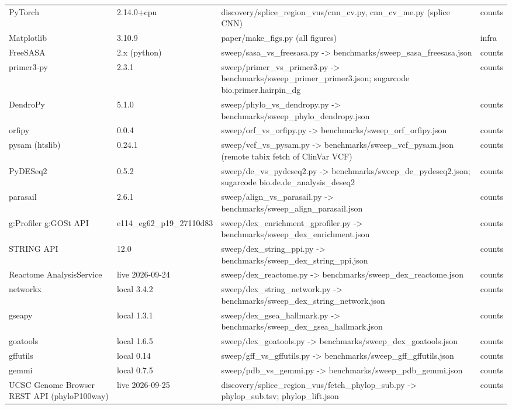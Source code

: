 \begin{center}
\begin{tabular}{lp{1.8cm}p{7.5cm}l}
PyTorch & 2.14.0+cpu & discovery/splice\_region\_vus/cnn\_cv.py, cnn\_cv\_me.py (splice CNN) & counts\\
Matplotlib & 3.10.9 & paper/make\_figs.py (all figures) & infra\\
FreeSASA & 2.x (python) & sweep/sasa\_vs\_freesasa.py -> benchmarks/sweep\_sasa\_freesasa.json & counts\\
primer3-py & 2.3.1 & sweep/primer\_vs\_primer3.py -> benchmarks/sweep\_primer\_primer3.json; sugarcode bio.primer.hairpin\_dg & counts\\
DendroPy & 5.1.0 & sweep/phylo\_vs\_dendropy.py -> benchmarks/sweep\_phylo\_dendropy.json & counts\\
orfipy & 0.0.4 & sweep/orf\_vs\_orfipy.py -> benchmarks/sweep\_orf\_orfipy.json & counts\\
pysam (htslib) & 0.24.1 & sweep/vcf\_vs\_pysam.py -> benchmarks/sweep\_vcf\_pysam.json (remote tabix fetch of ClinVar VCF) & counts\\
PyDESeq2 & 0.5.2 & sweep/de\_vs\_pydeseq2.py -> benchmarks/sweep\_de\_pydeseq2.json; sugarcode bio.de.de\_analysis\_deseq2 & counts\\
parasail & 2.6.1 & sweep/align\_vs\_parasail.py -> benchmarks/sweep\_align\_parasail.json & counts\\
g:Profiler g:GOSt API & e114\_eg62\_p19\_27110d83 & sweep/dex\_enrichment\_gprofiler.py -> benchmarks/sweep\_dex\_enrichment.json & counts\\
STRING API & 12.0 & sweep/dex\_string\_ppi.py -> benchmarks/sweep\_dex\_string\_ppi.json & counts\\
Reactome AnalysisService & live 2026-09-24 & sweep/dex\_reactome.py -> benchmarks/sweep\_dex\_reactome.json & counts\\
networkx & local 3.4.2 & sweep/dex\_string\_network.py -> benchmarks/sweep\_dex\_string\_network.json & counts\\
gseapy & local 1.3.1 & sweep/dex\_gsea\_hallmark.py -> benchmarks/sweep\_dex\_gsea\_hallmark.json & counts\\
goatools & local 1.6.5 & sweep/dex\_goatools.py -> benchmarks/sweep\_dex\_goatools.json & counts\\
gffutils & local 0.14 & sweep/gff\_vs\_gffutils.py -> benchmarks/sweep\_gff\_gffutils.json & counts\\
gemmi & local 0.7.5 & sweep/pdb\_vs\_gemmi.py -> benchmarks/sweep\_pdb\_gemmi.json & counts\\
UCSC Genome Browser REST API (phyloP100way) & live 2026-09-25 & discovery/splice\_region\_vus/fetch\_phylop\_sub.py -> phylop\_sub.tsv; phylop\_lift.json & counts\\

\end{tabular}
\end{center}

